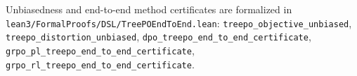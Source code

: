 \documentclass[11pt]{article}
\begin{document}
Unbiasedness and end-to-end method certificates are formalized in
\texttt{lean3/FormalProofs/DSL/TreePOEndToEnd.lean}:
\texttt{treepo\_objective\_unbiased},
\texttt{treepo\_distortion\_unbiased},
\texttt{dpo\_treepo\_end\_to\_end\_certificate},
\texttt{grpo\_pl\_treepo\_end\_to\_end\_certificate},
\texttt{grpo\_rl\_treepo\_end\_to\_end\_certificate}.



\end{document}
